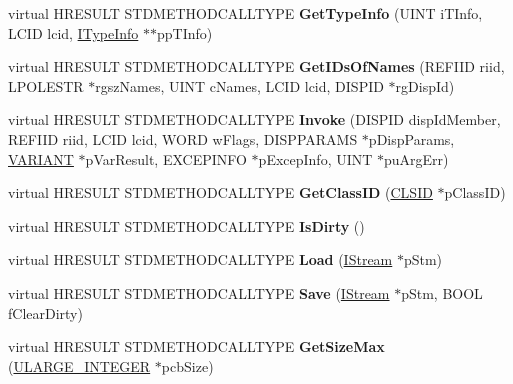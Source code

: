 \begin{DoxyCompactItemize}
\mbox{\label{class_c_address_edit_box_a00f5f11e7848ace15c70717b4f10d363}} 
virtual H\+R\+E\+S\+U\+LT S\+T\+D\+M\+E\+T\+H\+O\+D\+C\+A\+L\+L\+T\+Y\+PE {\bfseries Get\+Type\+Info} (U\+I\+NT i\+T\+Info, L\+C\+ID lcid, \hyperlink{interface_i_type_info}{I\+Type\+Info} $\ast$$\ast$pp\+T\+Info)
\item 
\mbox{\label{class_c_address_edit_box_a0bef8fb0f2a7a8ba71c10e4f7fa8fead}} 
virtual H\+R\+E\+S\+U\+LT S\+T\+D\+M\+E\+T\+H\+O\+D\+C\+A\+L\+L\+T\+Y\+PE {\bfseries Get\+I\+Ds\+Of\+Names} (R\+E\+F\+I\+ID riid, L\+P\+O\+L\+E\+S\+TR $\ast$rgsz\+Names, U\+I\+NT c\+Names, L\+C\+ID lcid, D\+I\+S\+P\+ID $\ast$rg\+Disp\+Id)
\item 
\mbox{\label{class_c_address_edit_box_a23842855a56a9683d7d6e13bc33dfc46}} 
virtual H\+R\+E\+S\+U\+LT S\+T\+D\+M\+E\+T\+H\+O\+D\+C\+A\+L\+L\+T\+Y\+PE {\bfseries Invoke} (D\+I\+S\+P\+ID disp\+Id\+Member, R\+E\+F\+I\+ID riid, L\+C\+ID lcid, W\+O\+RD w\+Flags, D\+I\+S\+P\+P\+A\+R\+A\+MS $\ast$p\+Disp\+Params, \hyperlink{structtag_v_a_r_i_a_n_t}{V\+A\+R\+I\+A\+NT} $\ast$p\+Var\+Result, E\+X\+C\+E\+P\+I\+N\+FO $\ast$p\+Excep\+Info, U\+I\+NT $\ast$pu\+Arg\+Err)
\item 
\mbox{\label{class_c_address_edit_box_aed3bef1573b9f082efda9aecc6ae8c25}} 
virtual H\+R\+E\+S\+U\+LT S\+T\+D\+M\+E\+T\+H\+O\+D\+C\+A\+L\+L\+T\+Y\+PE {\bfseries Get\+Class\+ID} (\hyperlink{struct___i_i_d}{C\+L\+S\+ID} $\ast$p\+Class\+ID)
\item 
\mbox{\label{class_c_address_edit_box_a2a7cba8c7fdbe554ae33232421dda382}} 
virtual H\+R\+E\+S\+U\+LT S\+T\+D\+M\+E\+T\+H\+O\+D\+C\+A\+L\+L\+T\+Y\+PE {\bfseries Is\+Dirty} ()
\item 
\mbox{\label{class_c_address_edit_box_a63e70905ab0adba3143fb0db09a1cf56}} 
virtual H\+R\+E\+S\+U\+LT S\+T\+D\+M\+E\+T\+H\+O\+D\+C\+A\+L\+L\+T\+Y\+PE {\bfseries Load} (\hyperlink{interface_i_stream}{I\+Stream} $\ast$p\+Stm)
\item 
\mbox{\label{class_c_address_edit_box_a208d1001d8b8ae890b3d03eb5459fe4e}} 
virtual H\+R\+E\+S\+U\+LT S\+T\+D\+M\+E\+T\+H\+O\+D\+C\+A\+L\+L\+T\+Y\+PE {\bfseries Save} (\hyperlink{interface_i_stream}{I\+Stream} $\ast$p\+Stm, B\+O\+OL f\+Clear\+Dirty)
\item 
\mbox{\label{class_c_address_edit_box_a353b93bfc52924dd5310d617d7618d99}} 
virtual H\+R\+E\+S\+U\+LT S\+T\+D\+M\+E\+T\+H\+O\+D\+C\+A\+L\+L\+T\+Y\+PE {\bfseries Get\+Size\+Max} (\hyperlink{struct___u_l_a_r_g_e___i_n_t_e_g_e_r}{U\+L\+A\+R\+G\+E\+\_\+\+I\+N\+T\+E\+G\+ER} $\ast$pcb\+Size)
\end{DoxyCompactItemize}
